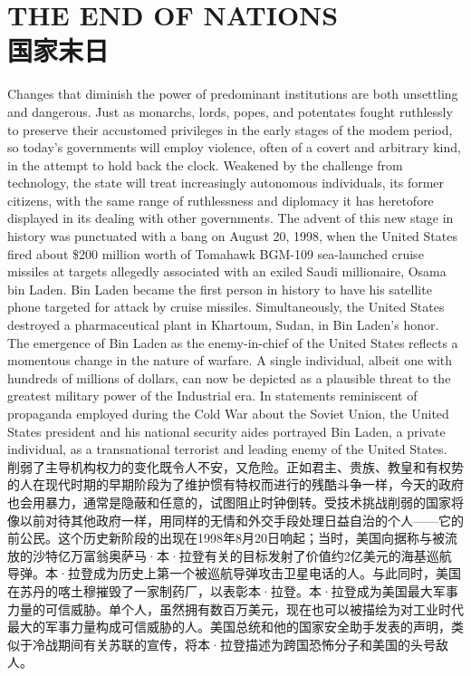 \section[国家末日]{THE END OF NATIONS\\国家末日}
\begin{paracol}{2}[]
Changes that diminish the power of predominant institutions are both unsettling and dangerous. Just as monarchs, lords, popes, and potentates fought ruthlessly to preserve their accustomed privileges in the early stages of the modem period, so today's governments will employ violence, often of a covert and arbitrary kind, in the attempt to hold back the clock. Weakened by the challenge from technology, the state will treat increasingly autonomous individuals, its former citizens, with the same range of ruthlessness and diplomacy it has heretofore displayed in its dealing with other governments. The advent of this new stage in history was punctuated with a bang on August 20, 1998, when the United States fired about \$200 million worth of Tomahawk BGM-109 sea-launched cruise missiles at targets allegedly associated with an exiled Saudi millionaire, Osama bin Laden. Bin Laden became the first person in history to have his satellite phone targeted for attack by cruise missiles. Simultaneously, the United States destroyed a pharmaceutical plant in Khartoum, Sudan, in Bin Laden's honor. The emergence of Bin Laden as the enemy-in-chief of the United States reflects a momentous change in the nature of warfare. A single individual, albeit one with hundreds of millions of dollars, can now be depicted as a plausible threat to the greatest military power of the Industrial era. In statements reminiscent of propaganda employed during the Cold War about the Soviet Union, the United States president and his national security aides portrayed Bin Laden, a private individual, as a transnational terrorist and leading enemy of the United States.
\switchcolumn
削弱了主导机构权力的变化既令人不安，又危险。正如君主、贵族、教皇和有权势的人在现代时期的早期阶段为了维护惯有特权而进行的残酷斗争一样，今天的政府也会用暴力，通常是隐蔽和任意的，试图阻止时钟倒转。受技术挑战削弱的国家将像以前对待其他政府一样，用同样的无情和外交手段处理日益自治的个人——它的前公民。这个历史新阶段的出现在1998年8月20日响起；当时，美国向据称与被流放的沙特亿万富翁奥萨马·本·拉登有关的目标发射了价值约2亿美元的海基巡航导弹。本·拉登成为历史上第一个被巡航导弹攻击卫星电话的人。与此同时，美国在苏丹的喀土穆摧毁了一家制药厂，以表彰本·拉登。本·拉登成为美国最大军事力量的可信威胁。单个人，虽然拥有数百万美元，现在也可以被描绘为对工业时代最大的军事力量构成可信威胁的人。美国总统和他的国家安全助手发表的声明，类似于冷战期间有关苏联的宣传，将本·拉登描述为跨国恐怖分子和美国的头号敌人。

\end{paracol}
